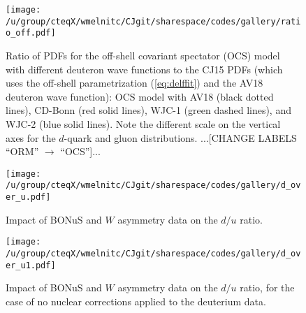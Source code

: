 \documentclass[aps,prd,amsmath,preprint]{revtex4}
\begin{document}
\begin{figure}[t]
\texttt{[image: /u/group/cteqX/wmelnitc/CJgit/sharespace/codes/gallery/ratio\_off.pdf]}
\caption{Ratio of PDFs for the off-shell covariant spectator (OCS)
	model with different deuteron wave functions to the CJ15 PDFs
	(which uses the off-shell parametrization (\ref{eq:delffit})
	and the AV18 deuteron wave function):
	OCS model with AV18 (black dotted lines),
	CD-Bonn (red solid lines),
	WJC-1 (green dashed lines), and
	WJC-2 (blue solid lines).
	Note the different scale on the vertical axes for the
	$d$-quark and gluon distributions.
	...[CHANGE LABELS ``ORM'' $\to$ ``OCS'']...}
\label{fig:ratio_off}
\end{figure} 



  


\begin{figure}[t]
\texttt{[image: /u/group/cteqX/wmelnitc/CJgit/sharespace/codes/gallery/d\_over\_u.pdf]}
\caption{Impact of BONuS \cite{BONuS} and $W$ asymmetry data
	on the $d/u$ ratio.}
\label{fig:du}
\end{figure} 


\begin{figure}[t]
\texttt{[image: /u/group/cteqX/wmelnitc/CJgit/sharespace/codes/gallery/d\_over\_u1.pdf]}
\caption{Impact of BONuS \cite{BONuS} and $W$ asymmetry data
	on the $d/u$ ratio, for the case of no nuclear corrections
	applied to the deuterium data.}
\label{fig:du1}
\end{figure} 
\end{document}
